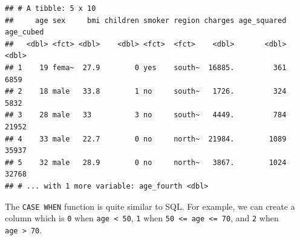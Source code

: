 \documentclass[openany]{book}
\newenvironment{Shaded}{\begin{snugshade}}{\end{snugshade}}
\newcommand{\DataTypeTok}[1]{\textcolor[rgb]{0.13,0.29,0.53}{#1}}
\newcommand{\DecValTok}[1]{\textcolor[rgb]{0.00,0.00,0.81}{#1}}
\newcommand{\KeywordTok}[1]{\textcolor[rgb]{0.13,0.29,0.53}{\textbf{#1}}}
\newcommand{\NormalTok}[1]{#1}
\newcommand{\OperatorTok}[1]{\textcolor[rgb]{0.81,0.36,0.00}{\textbf{#1}}}
\newcommand{\StringTok}[1]{\textcolor[rgb]{0.31,0.60,0.02}{#1}}
\begin{document}
\begin{Shaded}
\end{Shaded}

\begin{verbatim}
## # A tibble: 5 x 10
##     age sex     bmi children smoker region charges age_squared age_cubed
##   <dbl> <fct> <dbl>    <dbl> <fct>  <fct>    <dbl>       <dbl>     <dbl>
## 1    19 fema~  27.9        0 yes    south~  16885.         361      6859
## 2    18 male   33.8        1 no     south~   1726.         324      5832
## 3    28 male   33          3 no     south~   4449.         784     21952
## 4    33 male   22.7        0 no     north~  21984.        1089     35937
## 5    32 male   28.9        0 no     north~   3867.        1024     32768
## # ... with 1 more variable: age_fourth <dbl>
\end{verbatim}

The \texttt{CASE\ WHEN} function is quite similar to SQL. For example, we can create a column which is \texttt{0} when \texttt{age\ \textless{}\ 50}, \texttt{1} when \texttt{50\ \textless{}=\ age\ \textless{}=\ 70}, and \texttt{2} when \texttt{age\ \textgreater{}\ 70}.

\begin{Shaded}
\end{Shaded}
\end{document}
